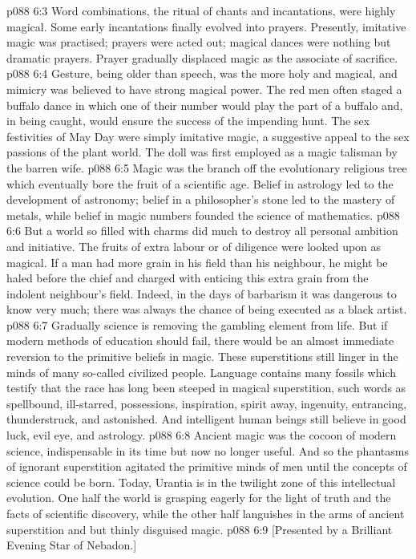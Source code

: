 \vs p088 6:3 Word combinations, the ritual of chants and incantations, were highly magical. Some early incantations finally evolved into prayers. Presently, imitative magic was practised; prayers were acted out; magical dances were nothing but dramatic prayers. Prayer gradually displaced magic as the associate of sacrifice.
\vs p088 6:4 Gesture, being older than speech, was the more holy and magical, and mimicry was believed to have strong magical power. The red men often staged a buffalo dance in which one of their number would play the part of a buffalo and, in being caught, would ensure the success of the impending hunt. The sex festivities of May Day were simply imitative magic, a suggestive appeal to the sex passions of the plant world. The doll was first employed as a magic talisman by the barren wife.
\vs p088 6:5 \pc Magic was the branch off the evolutionary religious tree which eventually bore the fruit of a scientific age. Belief in astrology led to the development of astronomy; belief in a philosopher’s stone led to the mastery of metals, while belief in magic numbers founded the science of mathematics.
\vs p088 6:6 \pc But a world so filled with charms did much to destroy all personal ambition and initiative. The fruits of extra labour or of diligence were looked upon as magical. If a man had more grain in his field than his neighbour, he might be haled before the chief and charged with enticing this extra grain from the indolent neighbour’s field. Indeed, in the days of barbarism it was dangerous to know very much; there was always the chance of being executed as a black artist.
\vs p088 6:7 Gradually science is removing the gambling element from life. But if modern methods of education should fail, there would be an almost immediate reversion to the primitive beliefs in magic. These superstitions still linger in the minds of many so\hyp{}called civilized people. Language contains many fossils which testify that the race has long been steeped in magical superstition, such words as spellbound, ill\hyp{}starred, possessions, inspiration, spirit away, ingenuity, entrancing, thunderstruck, and astonished. And intelligent human beings still believe in good luck, evil eye, and astrology.
\vs p088 6:8 Ancient magic was the cocoon of modern science, indispensable in its time but now no longer useful. And so the phantasms of ignorant superstition agitated the primitive minds of men until the concepts of science could be born. Today, Urantia is in the twilight zone of this intellectual evolution. One half the world is grasping eagerly for the light of truth and the facts of scientific discovery, while the other half languishes in the arms of ancient superstition and but thinly disguised magic.
\vsetoff
\vs p088 6:9 [Presented by a Brilliant Evening Star of Nebadon.]
\quizlink
